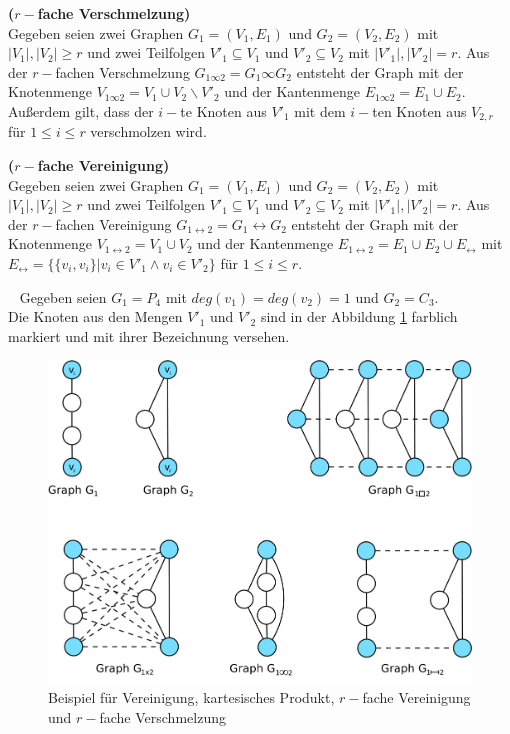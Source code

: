 \begin{defi}{\textbf{($r-$fache Verschmelzung)}}\\
Gegeben seien zwei Graphen $G_1=(V_1,E_1)$ und $G_2=(V_2,E_2)$ mit $|V_1|, |V_2| \geq r$ und zwei Teilfolgen $V'_{1} \subseteq V_1$ und $V'_{2} \subseteq V_2$ mit $|V'_{1}|, |V'_{2}| = r$. Aus der $r-$fachen Verschmelzung $G_{1 \infty 2}=G_1 \infty G_2$ entsteht der Graph mit der Knotenmenge $V_{1 \infty 2}=V_1 \cup V_2\backslash V'_{2}$ und der Kantenmenge $E_{1\infty 2}= E_1 \cup E_2$. Außerdem gilt, dass der $i-$te Knoten aus $V'_{1}$ mit dem $i-$ten Knoten aus $V_{2,r}$ für $1 \leq i \leq r$ verschmolzen wird. 
\end{defi}

\begin{defi}{\textbf{($r-$fache Vereinigung)}}\\
Gegeben seien zwei Graphen $G_1=(V_1,E_1)$ und $G_2=(V_2,E_2)$ mit $|V_1|, |V_2| \geq r$ und zwei Teilfolgen $V'_{1} \subseteq V_1$ und $V'_{2} \subseteq V_2$ mit $|V'_{1}|, |V'_{2}| = r$. 
Aus der $r-$fachen Vereinigung $G_{1 \leftrightarrow 2}= G_1 \leftrightarrow G_2$ entsteht der Graph mit der Knotenmenge $V_{1 \leftrightarrow 2}=V_1 \cup V_2$ und der Kantenmenge $E_{1\leftrightarrow 2}= E_1 \cup E_2 \cup E_{\leftrightarrow }$ mit $E_{\leftrightarrow}=\{\{v_i,v_i\}| v_i \in V'_{1} \wedge v_i \in V'_{2} \}$ für $1 \leq i \leq r$. 
\end{defi}
\begin{bsp} ~ \newline
Gegeben seien $G_1=P_4$ mit $deg(v_1)=deg(v_2)=1$ und $G_2=C_3$.\\Die Knoten aus den Mengen $V'_1$ und $V'_2$ sind in der Abbildung \ref{bild:vereinigung} farblich markiert und mit ihrer Bezeichnung versehen.
\begin{figure}[h!]
		\centering 		 
   \includegraphics[width=350pt]{bilder/struktur2.pdf}
	\caption{Beispiel für Vereinigung, kartesisches Produkt, $r-$fache Vereinigung und $r-$fache Verschmelzung}
  	 \label{bild:vereinigung}
  	 \end{figure}
\end{bsp}
